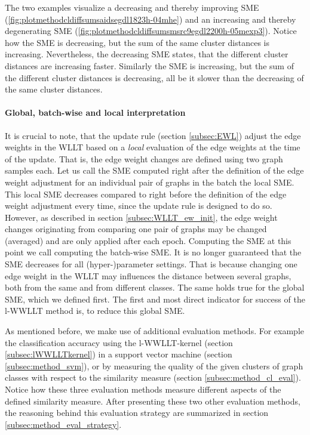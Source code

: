 		The two examples visualize a decreasing and thereby improving SME (\ref{fig:plotmethodcldiffsumsaidsegdl1823h-04mhe})
		and an increasing and thereby degenerating SME (\ref{fig:plotmethodcldiffsumsmsrc9egdl2200h-05mexp3}).
		Notice how the SME is decreasing, but the sum of the same cluster distances is increasing.
		Nevertheless, the decreasing SME states, that the different cluster distances are increasing faster.
		Similarly the SME is increasing, but the sum of the different cluster distances is decreasing, all be it slower than the decreasing of the same cluster distances.		

		\paragraph{Global, batch-wise and local interpretation}
		It is crucial to note, that the update rule (section \ref{subsec:EWL}) adjust the edge weights in the WLLT based on a \textit{local} evaluation of the edge weights at the time of the update.
		That is, the edge weight changes are defined using two graph samples each.
		Let us call the SME computed right after the definition of the edge weight adjustment for an individual pair of graphs in the batch the local SME.
		This local SME decreases compared to right before the definition of the edge weight adjustment every time, since the update rule is designed to do so.
		However, as described in section \ref{subsec:WLLT_ew_init}, the edge weight changes originating from comparing one pair of graphs may be changed (averaged) and are only applied after each epoch.
		Computing the SME at this point we call computing the batch-wise SME.
		It is no longer guaranteed that the SME decreases for all (hyper-)parameter settings.
		That is because changing one edge weight in the WLLT may influences the distance between several graphs, both from the same and from different classes.
		The same holds true for the global SME, which we defined first. 
		The first and most direct indicator for success of the l-WWLLT method is, to reduce this global SME.
		
		As mentioned before, we make use of additional evaluation methods.
		For example the classification accuracy using the l-WWLLT-kernel (section \ref{subsec:lWWLLTkernel}) in a support vector machine (section \ref{subsec:method_svm}), 
		or by measuring the quality of the given clusters of graph classes with respect to the similarity measure (section \ref{subsec:method_cl_eval}).
		Notice how these three evaluation methods measure different aspects of the defined similarity measure.
		After presenting these two other evaluation methods, the reasoning behind this evaluation strategy are summarized in section \ref{subsec:method_eval_strategy}.
		
